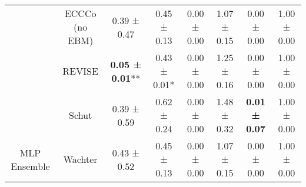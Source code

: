 \begin{table}
{\begin{tabular}[t]{cccccccc}
 & ECCCo (no EBM) & 0.39 ± 0.47\hphantom{*}\hphantom{*} & 0.45 ± 0.13\hphantom{*}\hphantom{*} & 0.00 ± 0.00\hphantom{*}\hphantom{*} & 1.07 ± 0.15\hphantom{*}\hphantom{*} & 0.00 ± 0.00\hphantom{*}\hphantom{*} & 1.00 ± 0.00\hphantom{*}\hphantom{*}\\

 & REVISE & \textbf{0.05 ± 0.01}** & 0.43 ± 0.01*\hphantom{*} & 0.00 ± 0.00\hphantom{*}\hphantom{*} & 1.25 ± 0.16\hphantom{*}\hphantom{*} & 0.00 ± 0.00\hphantom{*}\hphantom{*} & 1.00 ± 0.00\hphantom{*}\hphantom{*}\\

 & Schut & 0.39 ± 0.59\hphantom{*}\hphantom{*} & 0.62 ± 0.24\hphantom{*}\hphantom{*} & 0.00 ± 0.00\hphantom{*}\hphantom{*} & 1.48 ± 0.32\hphantom{*}\hphantom{*} & \textbf{0.01 ± 0.07}\hphantom{*}\hphantom{*} & 1.00 ± 0.00\hphantom{*}\hphantom{*}\\

\multirow[t]{-9}{*}{\centering\arraybackslash MLP Ensemble} & Wachter & 0.43 ± 0.52\hphantom{*}\hphantom{*} & 0.45 ± 0.13\hphantom{*}\hphantom{*} & 0.00 ± 0.00\hphantom{*}\hphantom{*} & 1.07 ± 0.15\hphantom{*}\hphantom{*} & 0.00 ± 0.00\hphantom{*}\hphantom{*} & 1.00 ± 0.00\hphantom{*}\hphantom{*}\\
\bottomrule
\end{tabular}}
\end{table}
